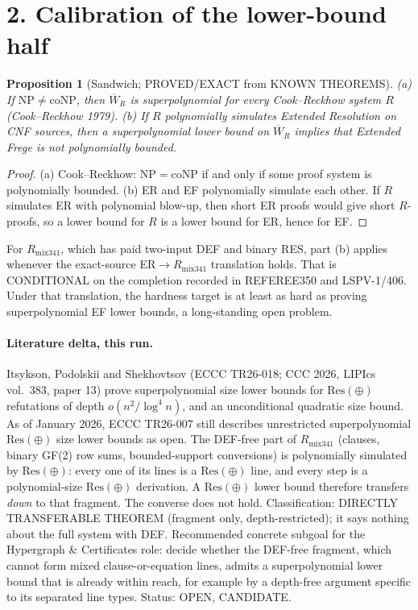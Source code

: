 \documentclass[11pt]{article}
\newtheorem{proposition}{Proposition}
\begin{document}
\section*{2. Calibration of the lower-bound half}
\begin{proposition}[Sandwich; PROVED/EXACT from KNOWN THEOREMS]
(a) If $\mathrm{NP}\neq\mathrm{coNP}$, then $\overline W_R$ is superpolynomial for every
Cook--Reckhow system $R$ (Cook--Reckhow 1979).
(b) If $R$ polynomially simulates Extended Resolution on CNF sources, then a superpolynomial
lower bound on $\overline W_R$ implies that Extended Frege is not polynomially bounded.
\end{proposition}
\begin{proof}
(a) Cook--Reckhow: $\mathrm{NP}=\mathrm{coNP}$ if and only if some proof system is
polynomially bounded. (b) ER and EF polynomially simulate each other. If $R$ simulates ER
with polynomial blow-up, then short ER proofs would give short $R$-proofs, so a lower bound
for $R$ is a lower bound for ER, hence for EF.
\end{proof}
For $R_{\mathrm{mix341}}$, which has paid two-input DEF and binary RES, part (b) applies
whenever the exact-source ER$\to R_{\mathrm{mix341}}$ translation holds. That is CONDITIONAL
on the completion recorded in REFEREE350 and LSPV-1/406. Under that translation, the hardness
target is at least as hard as proving superpolynomial EF lower bounds, a long-standing open
problem.

\paragraph{Literature delta, this run.} Itsykson, Podolskii and Shekhovtsov (ECCC TR26-018;
CCC 2026, LIPIcs vol.~383, paper 13) prove superpolynomial size lower bounds for
$\mathrm{Res}(\oplus)$ refutations of depth $o(n^2/\log^4 n)$, and an unconditional quadratic
size bound. As of January 2026, ECCC TR26-007 still describes unrestricted superpolynomial
$\mathrm{Res}(\oplus)$ size lower bounds as open. The DEF-free part of $R_{\mathrm{mix341}}$
(clauses, binary GF(2) row sums, bounded-support conversions) is polynomially simulated by
$\mathrm{Res}(\oplus)$: every one of its lines is a $\mathrm{Res}(\oplus)$ line, and every
step is a polynomial-size $\mathrm{Res}(\oplus)$ derivation. A $\mathrm{Res}(\oplus)$ lower
bound therefore transfers \emph{down} to that fragment. The converse does not hold.
Classification: DIRECTLY TRANSFERABLE THEOREM (fragment only, depth-restricted); it says
nothing about the full system with DEF. Recommended concrete subgoal for the Hypergraph \&
Certificates role: decide whether the DEF-free fragment, which cannot form mixed
clause-or-equation lines, admits a superpolynomial lower bound that is already within reach,
for example by a depth-free argument specific to its separated line types. Status: OPEN,
CANDIDATE.
\end{document}
